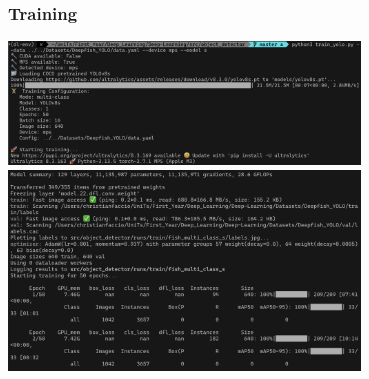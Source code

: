 \documentclass[serif]{beamer}  %
\begin{document}
\begin{frame}
\frametitle{Training}
\centering
\includegraphics[width=0.7\textwidth]{images/training1.png}
\vspace{0.5cm}
\includegraphics[width=0.7\textwidth]{images/training2.png}
\end{frame}
\end{document}
